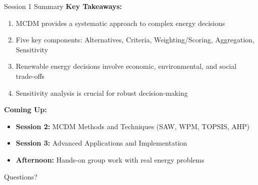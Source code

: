 \documentclass[aspectratio=169]{beamer}
\begin{document}
\begin{frame}{Session 1 Summary}
\textbf{Key Takeaways:}
\begin{enumerate}
\item MCDM provides a systematic approach to complex energy decisions
\item Five key components: Alternatives, Criteria, Weighting/Scoring, Aggregation, Sensitivity
\item Renewable energy decisions involve economic, environmental, and social trade-offs
\item Sensitivity analysis is crucial for robust decision-making
\end{enumerate}

\vspace{0.5cm}
\textbf{Coming Up:}
\begin{itemize}
\item \textbf{Session 2:} MCDM Methods and Techniques (SAW, WPM, TOPSIS, AHP)
\item \textbf{Session 3:} Advanced Applications and Implementation
\item \textbf{Afternoon:} Hands-on group work with real energy problems
\end{itemize}

\vspace{0.5cm}
\begin{center}
\textcolor{energygreen}{\Large Questions?}
\end{center}
\end{frame}
\end{document}
